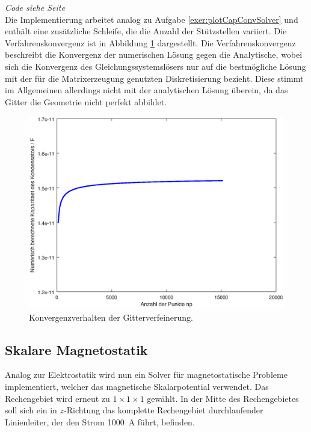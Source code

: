 \documentclass[./Protokollheft.tex]{subfiles}
\begin{document}
\textit{ Code siehe Seite \pageref{code4.6} } \\
Die Implementierung arbeitet analog zu Aufgabe \ref{exer:plotCapConvSolver} und enthält eine zusätzliche Schleife, die die Anzahl der Stützstellen variiert.
Die Verfahrenskonvergenz ist in Abbildung \ref{fig:V4.PA6} dargestellt.
Die Verfahrenskonvergenz beschreibt die Konvergenz der numerischen Lösung gegen die Analytische, wobei sich die Konvergenz des Gleichungssystemslösers nur auf die bestmögliche Lösung mit der für die Matrixerzeugung genutzten Diskretisierung bezieht. Diese stimmt im Allgemeinen allerdings nicht mit der analytischen Lösung überein, da das Gitter die Geometrie nicht perfekt abbildet.
\begin{figure}[hp]
\begin{center}
\includegraphics[scale=0.7]{eps/plotConvCap}
\end{center}
\caption{Konvergenzverhalten der Gitterverfeinerung.}
\label{fig:V4.PA6}
\end{figure}

%
{\subsection{Skalare Magnetostatik}}
Analog zur Elektrostatik wird nun ein Solver für magnetostatische Probleme implementiert, welcher das magnetische Skalarpotential verwendet. Das Rechengebiet wird erneut zu $1\times 1\times 1$ gewählt. In der Mitte des Rechengebietes soll sich ein in $z$-Richtung das komplette Rechengebiet durchlaufender Linienleiter, der den Strom \SI{1000}{A} führt, befinden.
\end{document}
